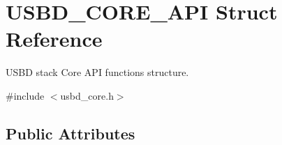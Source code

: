 \hypertarget{struct_u_s_b_d___c_o_r_e___a_p_i}{}\section{U\+S\+B\+D\+\_\+\+C\+O\+R\+E\+\_\+\+A\+PI Struct Reference}
\label{struct_u_s_b_d___c_o_r_e___a_p_i}


U\+S\+BD stack Core A\+PI functions structure.  




{\ttfamily \#include $<$usbd\+\_\+core.\+h$>$}

\subsection*{Public Attributes}
